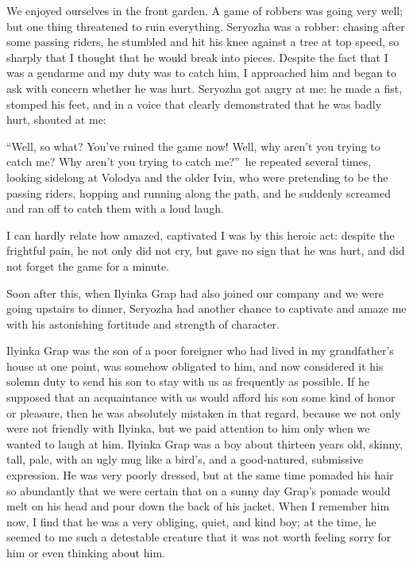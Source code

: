 We enjoyed ourselves in the front garden. A game of robbers was going very well; but one thing threatened to ruin everything. Seryozha was a robber: chasing after some passing riders, he stumbled and hit his knee against a tree at top speed, so sharply that I thought that he would break into pieces. Despite the fact that I was a gendarme and my duty was to catch him, I approached him and began to ask with concern whether he was hurt. Seryozha got angry at me: he made a fist, stomped his feet, and in a voice that clearly demonstrated that he was badly hurt, shouted at me:

``Well, so what? You've ruined the game now! Well, why aren't you trying to catch me? Why aren't you trying to catch me?''~he repeated several times, looking sidelong at Volodya and the older Ivin, who were pretending to be the passing riders, hopping and running along the path, and he suddenly screamed and ran off to catch them with a loud laugh.

I can hardly relate how amazed, captivated I was by this heroic act: despite the frightful pain, he not only did not cry, but gave no sign that he was hurt, and did not forget the game for a minute.

Soon after this, when Ilyinka Grap had also joined our company and we were going upstairs to dinner, Seryozha had another chance to captivate and amaze me with his astonishing fortitude and strength of character.

Ilyinka Grap was the son of a poor foreigner who had lived in my grandfather's house at one point, was somehow obligated to him, and now considered it his solemn duty to send his son to stay with us as frequently as possible. If he supposed that an acquaintance with us would afford his son some kind of honor or pleasure, then he was absolutely mistaken in that regard, because we not only were not friendly with Ilyinka, but we paid attention to him only when we wanted to laugh at him. Ilyinka Grap was a boy about thirteen years old, skinny, tall, pale, with an ugly mug like a bird's, and a good-natured, submissive expression. He was very poorly dressed, but at the same time pomaded his hair so abundantly that we were certain that on a sunny day Grap's pomade would melt on his head and pour down the back of his jacket. When I remember him now, I find that he was a very obliging, quiet, and kind boy; at the time, he seemed to me such a detestable creature that it was not worth feeling sorry for him or even thinking about him.

